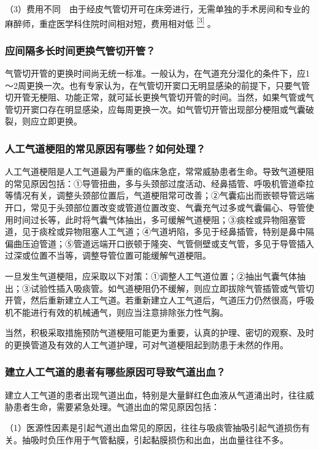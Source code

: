 （3）费用不同　由于经皮气管切开可在床旁进行，无需单独的手术房间和专业的麻醉师，重症医学科住院时间相对短，费用相对低
\protect\hyperlink{text00015.htmlux5cux23ch3-14}{\textsuperscript{{[}3{]}}}
。

\subsubsection{应间隔多长时间更换气管切开管？}

气管切开管的更换时间尚无统一标准。一般认为，在气道充分湿化的条件下，应1～2周更换一次。也有专家认为，在气管切开窦口无明显感染的前提下，只要气管切开管无梗阻、功能正常，就可延长更换气管切开管的时间。当然，如果气管或气管切开窦口存在明显感染，应每周更换一次。如气管切开管出现部分梗阻或气囊破裂，则应立即更换。

\subsubsection{人工气道梗阻的常见原因有哪些？如何处理？}

人工气道梗阻是人工气道最为严重的临床急症，常常威胁患者生命。导致气道梗阻的常见原因包括：①导管扭曲，多与头颈部过度活动、经鼻插管、呼吸机管道牵拉等情况有关，调整头颈部位置后，气道梗阻常可改善；②气囊疝出而嵌顿导管远端开口，常见于头颈部位置改变或管道位置改变、气囊充气过多或气囊偏心、导管使用时间过长等，此时将气囊气体抽出，多可缓解气道梗阻；③痰栓或异物阻塞管道，见于痰栓或异物阻塞人工气道；④气道坍陷，多见于经鼻插管，特别是鼻中隔偏曲压迫管道；⑤管道远端开口嵌顿于隆突、气管侧壁或支气管，多见于导管插入过深或位置不当等，调整导管位置可能缓解气道梗阻。

一旦发生气道梗阻，应采取以下对策：①调整人工气道位置；②抽出气囊气体抽出；③试验性插入吸痰管。如气道梗阻仍不缓解，则应立即拔除气管插管或气管切开管，然后重新建立人工气道。若重新建立人工气道后，气道压力仍然很高，呼吸机不能进行有效的机械通气，则应当注意排除张力性气胸。

当然，积极采取措施预防气道梗阻可能更为重要，认真的护理、密切的观察、及时的更换管道及有效的人工气道护理，可对气道梗阻起到防患于未然的作用。

\subsubsection{建立人工气道的患者有哪些原因可导致气道出血？}

建立人工气道的患者出现气道出血，特别是大量鲜红色血液从气道涌出时，往往威胁患者生命，需要紧急处理。气道出血的常见原因包括：

（1）医源性因素是引起气道出血常见的原因，往往与吸痰管抽吸引起气道损伤有关。抽吸时负压作用于气管黏膜，引起黏膜损伤和出血，出血量往往不多。

